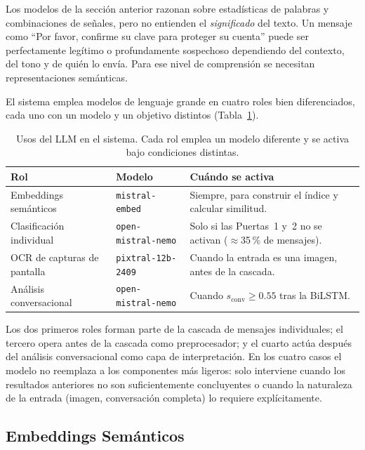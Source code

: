 \documentclass{llncs}
\begin{document}
Los modelos de la sección anterior razonan sobre estadísticas
de palabras y combinaciones de señales, pero no entienden el
\emph{significado} del texto.
Un mensaje como ``Por favor, confirme su clave para proteger
su cuenta'' puede ser perfectamente legítimo o profundamente
sospechoso dependiendo del contexto, del tono y de quién lo envía.
Para ese nivel de comprensión se necesitan representaciones
semánticas.

El sistema emplea modelos de lenguaje grande en cuatro roles
bien diferenciados, cada uno con un modelo y un objetivo distintos
(Tabla~\ref{tab:llm_uses}).

\begin{table}[t]
\caption{Usos del LLM en el sistema. Cada rol emplea un modelo
  diferente y se activa bajo condiciones distintas.}
\label{tab:llm_uses}
\centering
\small
\begin{tabular}{p{3.2cm}p{2.8cm}p{5.2cm}}
\toprule
Rol & Modelo & Cuándo se activa \\
\midrule
Embeddings semánticos &
  \texttt{mistral-embed} &
  Siempre, para construir el índice y calcular similitud. \\
Clasificación individual &
  \texttt{open-mistral-nemo} &
  Solo si las Puertas~1 y~2 no se activan ($\approx$35\,\% de mensajes). \\
OCR de capturas de pantalla &
  \texttt{pixtral-12b-2409} &
  Cuando la entrada es una imagen, antes de la cascada. \\
Análisis conversacional &
  \texttt{open-mistral-nemo} &
  Cuando $s_{\mathrm{conv}} \geq 0.55$ tras la BiLSTM. \\
\bottomrule
\end{tabular}
\end{table}

Los dos primeros roles forman parte de la cascada de mensajes
individuales; el tercero opera antes de la cascada como preprocesador;
y el cuarto actúa después del análisis conversacional como capa de
interpretación.
En los cuatro casos el modelo no reemplaza a los componentes más
ligeros: solo interviene cuando los resultados anteriores no son
suficientemente concluyentes o cuando la naturaleza de la entrada
(imagen, conversación completa) lo requiere explícitamente.

\subsection{Embeddings Semánticos}
\label{sec:llm:emb}
\end{document}
